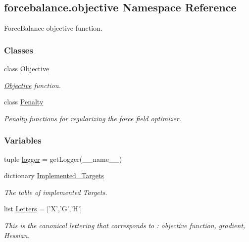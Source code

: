 \hypertarget{namespaceforcebalance_1_1objective}{\subsection{forcebalance.\-objective Namespace Reference}
\label{namespaceforcebalance_1_1objective}
}


Force\-Balance objective function.  


\subsubsection*{Classes}
\begin{DoxyCompactItemize}
\item 
class \hyperlink{classforcebalance_1_1objective_1_1Objective}{Objective}
\begin{DoxyCompactList}\small\item\em \hyperlink{classforcebalance_1_1objective_1_1Objective}{Objective} function. \end{DoxyCompactList}\item 
class \hyperlink{classforcebalance_1_1objective_1_1Penalty}{Penalty}
\begin{DoxyCompactList}\small\item\em \hyperlink{classforcebalance_1_1objective_1_1Penalty}{Penalty} functions for regularizing the force field optimizer. \end{DoxyCompactList}\end{DoxyCompactItemize}
\subsubsection*{Variables}
\begin{DoxyCompactItemize}
\item 
tuple \hyperlink{namespaceforcebalance_1_1objective_ac2e1e8c9612652836168e5cdde77b6e7}{logger} = get\-Logger(\-\_\-\-\_\-name\-\_\-\-\_\-)
\item 
dictionary \hyperlink{namespaceforcebalance_1_1objective_a8c93e21f995ed17addb493ec94368ab5}{Implemented\-\_\-\-Targets}
\begin{DoxyCompactList}\small\item\em The table of implemented Targets. \end{DoxyCompactList}\item 
list \hyperlink{namespaceforcebalance_1_1objective_a89a971322532b36852765b2680651f1f}{Letters} = \mbox{[}'X','G','H'\mbox{]}
\begin{DoxyCompactList}\small\item\em This is the canonical lettering that corresponds to \-: objective function, gradient, Hessian. \end{DoxyCompactList}\end{DoxyCompactItemize}


